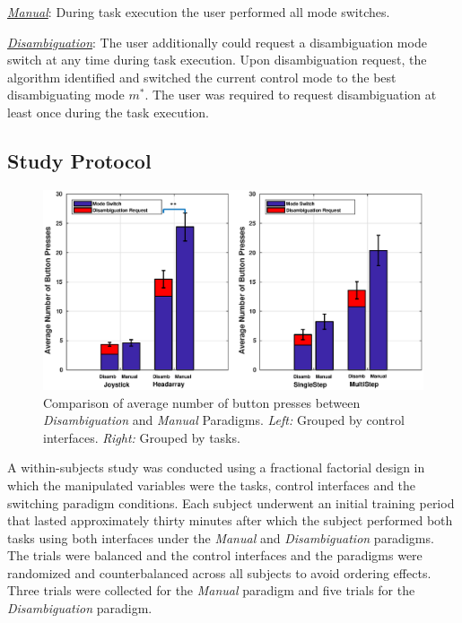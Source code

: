 \documentclass[natbib, twocolumn]{svjour3}          %
\begin{document}
\noindent\underline{\textit{Manual}}: During task execution the user performed all mode switches. 

\noindent\underline{\textit{Disambiguation}}: The user additionally could request a disambiguation mode switch at any time during task execution. Upon disambiguation request, the algorithm identified and switched the current control mode to the best disambiguating mode $m^*$. The user was required to request disambiguation at least once during the task execution.  



\subsection{Study Protocol}
 
\begin{figure}[ht!]
	\centering
	\includegraphics[keepaspectratio, width = 0.91\hsize ,center]{Fig7.eps}
	\caption{Comparison of average number of button presses between \textit{Disambiguation} and \textit{Manual} Paradigms. \textit{Left:} Grouped by control interfaces. \textit{Right:} Grouped by tasks.}
	\label{fig:button_press}
\end{figure}
A within-subjects study was conducted using a fractional factorial design in which the manipulated variables were the tasks, control interfaces and the switching paradigm conditions. Each subject underwent an initial training period that lasted approximately thirty minutes after which the subject performed both tasks using both interfaces under the \textit{Manual} and \textit{Disambiguation} paradigms. The trials were balanced and the control interfaces and the paradigms were randomized and counterbalanced across all subjects to avoid ordering effects. Three trials were collected for the \textit{Manual} paradigm and five trials for the \textit{Disambiguation} paradigm. 
\end{document}
